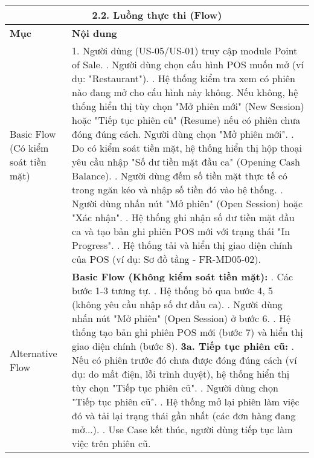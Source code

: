 \begin{longtable}{|m{4cm}|p{11cm}|}
\hline
\multicolumn{2}{|c|}{\textbf{2.2. Luồng thực thi (Flow)}} \\
\hline
\textbf{Mục} & \textbf{Nội dung} \\
\hline
Basic Flow (Có kiểm soát tiền mặt) & 1. Người dùng (US-05/US-01) truy cập module Point of Sale. \newline 2. Người dùng chọn cấu hình POS muốn mở (ví dụ: "Restaurant"). \newline 3. Hệ thống kiểm tra xem có phiên nào đang mở cho cấu hình này không. Nếu không, hệ thống hiển thị tùy chọn "Mở phiên mới" (New Session) hoặc "Tiếp tục phiên cũ" (Resume) nếu có phiên chưa đóng đúng cách. Người dùng chọn "Mở phiên mới". \newline 4. Do có kiểm soát tiền mặt, hệ thống hiển thị hộp thoại yêu cầu nhập "Số dư tiền mặt đầu ca" (Opening Cash Balance). \newline 5. Người dùng đếm số tiền mặt thực tế có trong ngăn kéo và nhập số tiền đó vào hệ thống. \newline 6. Người dùng nhấn nút "Mở phiên" (Open Session) hoặc "Xác nhận". \newline 7. Hệ thống ghi nhận số dư tiền mặt đầu ca và tạo bản ghi phiên POS mới với trạng thái "In Progress". \newline 8. Hệ thống tải và hiển thị giao diện chính của POS (ví dụ: Sơ đồ tầng - FR-MD05-02). \\
\hline
Alternative Flow & \textbf{Basic Flow (Không kiểm soát tiền mặt):} \newline    1. Các bước 1-3 tương tự. \newline    2. Hệ thống bỏ qua bước 4, 5 (không yêu cầu nhập số dư đầu ca). \newline    3. Người dùng nhấn nút "Mở phiên" (Open Session) ở bước 6. \newline    4. Hệ thống tạo bản ghi phiên POS mới (bước 7) và hiển thị giao diện chính (bước 8). \newline \textbf{3a. Tiếp tục phiên cũ:} \newline    1. Nếu có phiên trước đó chưa được đóng đúng cách (ví dụ: do mất điện, lỗi trình duyệt), hệ thống hiển thị tùy chọn "Tiếp tục phiên cũ". \newline    2. Người dùng chọn "Tiếp tục phiên cũ". \newline    3. Hệ thống mở lại phiên làm việc đó và tải lại trạng thái gần nhất (các đơn hàng đang mở...). \newline    4. Use Case kết thúc, người dùng tiếp tục làm việc trên phiên cũ. \\

\end{longtable}
